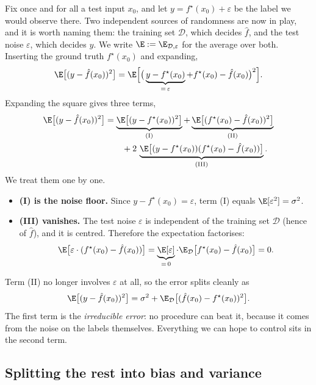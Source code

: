 Fix once and for all a test input $x_0$, and let $y = f^\star(x_0) + \varepsilon$ be
the label we would observe there. Two independent sources of randomness are now in
play, and it is worth naming them: the training set $\mathcal{D}$, which decides
$\hat f$, and the test noise $\varepsilon$, which decides $y$. We write
$\E := \E_{\mathcal{D}, \varepsilon}$ for the average over both. Inserting the ground
truth $f^\star(x_0)$ and expanding,
\[
\E\big[(y - \hat f(x_0))^2\big]
= \E\Big[ \big( \underbrace{y - f^\star(x_0)}_{= \, \varepsilon}
  + f^\star(x_0) - \hat f(x_0) \big)^2 \Big] .
\]
Expanding the square gives three terms,
\begin{align*}
\E\big[(y - \hat f(x_0))^2\big]
&= \underbrace{\E\big[(y - f^\star(x_0))^2\big]}_{\text{(I)}}
+ \underbrace{\E\big[(f^\star(x_0) - \hat f(x_0))^2\big]}_{\text{(II)}} \\
&\qquad + 2\, \underbrace{\E\big[(y - f^\star(x_0))(f^\star(x_0) - \hat f(x_0))\big]}_{\text{(III)}} .
\end{align*}
We treat them one by one.
\begin{itemize}
    \item \textbf{(I) is the noise floor.} Since $y - f^\star(x_0) = \varepsilon$,
    term (I) equals $\E[\varepsilon^2] = \sigma^2$.
    \item \textbf{(III) vanishes.} The test noise $\varepsilon$ is independent of the
    training set $\mathcal{D}$ (hence of $\hat f$), and it is centred. Therefore the
    expectation factorises:
    \[
    \E\big[\varepsilon \cdot (f^\star(x_0) - \hat f(x_0))\big]
    = \underbrace{\E[\varepsilon]}_{= \, 0} \cdot
      \E_{\mathcal{D}}\big[f^\star(x_0) - \hat f(x_0)\big] = 0 .
    \]
\end{itemize}
Term (II) no longer involves $\varepsilon$ at all, so the error splits cleanly as
\[
\E\big[(y - \hat f(x_0))^2\big]
= \sigma^2 + \E_{\mathcal{D}}\big[(\hat f(x_0) - f^\star(x_0))^2\big] .
\]
The first term is the \emph{irreducible error}: no procedure can beat it, because it
comes from the noise on the labels themselves. Everything we can hope to control
sits in the second term.

\subsection{Splitting the rest into bias and variance}

